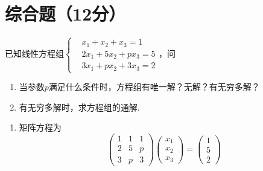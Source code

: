 \section{综合题（12分）}
\vspace{-1em}
\begin{exercise}
    已知线性方程组$
    \left\{
        \begin{aligned}
            &x_1+x_2+x_3=1\\
            &2x_1+5x_2+px_3=5\\
            &3x_1+px_2+3x_3=2
        \end{aligned}
    \right.
    $，问
    \vspace{1em}
    \begin{enumerate}
        \item 当参数$p$满足什么条件时，方程组有唯一解？无解？有无穷多解？
        \item 有无穷多解时，求方程组的通解.
    \end{enumerate}
\end{exercise}
\begin{solution}
    \begin{enumerate}
        \item 矩阵方程为
        $$
        \begin{pmatrix}
            1 & 1 & 1\\
            2 & 5 & p\\
            3 & p & 3
        \end{pmatrix}
        \begin{pmatrix}
            x_1\\x_2\\x_3
        \end{pmatrix}=
        \begin{pmatrix}
            1\\5\\2
        \end{pmatrix}
        $$
    \end{enumerate}
\end{solution}